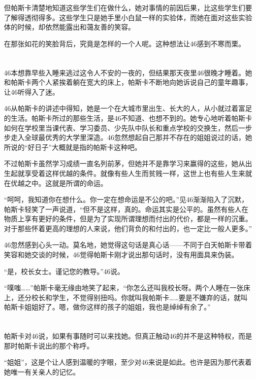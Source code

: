 但帕斯卡清楚地知道这些学生们在做什么，她对事情的前因后果，比这些学生们要了解得透彻得多。这些学生只是她手里小白鼠一样的实验体，而她在面对这些实验体的时候，却依然能露出和蔼友善的笑容。

在那张如花的笑脸背后，究竟是怎样的一个人呢。这种想法让46感到不寒而栗。

\section*{}

46本想靠早些入睡来逃过这令人不安的一夜的，但结果那天夜里46很晚才睡着。她和帕斯卡两个人紧挨着躺在宽大的床上，帕斯卡不断地向她诉说自己的童年趣事，让46听得入了迷。

46从帕斯卡的讲述中得知，她是一个在大城市里出生、长大的人，从小就过着富足的生活。帕斯卡所过的那些生活，是46不知道、也想不到的。她专心地听着帕斯卡如何在学校里当课代表、学习委员、少先队中队长和重点学校的交换生，然后一步步走入全球最优秀的大学里深造。46忽然想起自己那并不存在的姐姐说过的话，她所说的“好日子”大概就是指的帕斯卡这种吧。

不过帕斯卡虽然学习成绩一直名列前茅，但她并不是靠学习来赢得的这些，她从出生起就享受着这样优越的条件。就像有些人生而贫贱一样，这世上也有些人生来就在优越之中。这就是所谓的命运。

“呵呵，我知道你在想什么。你一定在想命运是不公的吧。”见46渐渐陷入了沉默，帕斯卡轻笑了一声说道，“但不是这样，真的。命运其实是公平的。虽然有些人在物质上享有更好的条件，但是为了实现所谓理想而付出的代价，都是一样的沉重。对于那些怀着更高的理想的人来说，他们背负的和付出的，也一定比一般人更多。”

46忽然感到心头一动。莫名地，她觉得这句话是真心话——不同于白天帕斯卡带着笑容和她交谈的时候，46觉得帕斯卡刚才说出那句话时，没有用面具来伪装。

“是，校长女士。谨记您的教导。”46说。

“噗嗤……”帕斯卡毫无缘由地笑了起来，“你怎么还叫我校长呀。两个人睡在一张床上，还分校长和学生，不觉得别扭吗。你就叫我帕斯卡……要是不嫌弃的话，就叫帕斯卡姐姐好了。嗯，做你这样的孩子的姐姐，我也是绰绰有余了。”

\section*{}

帕斯卡对46说，如果有事随时可以来找她。但真正触动46的并不是这种特权，而是那时帕斯卡说出的那个称呼。

“姐姐”，这是个让人感到温暖的字眼，至少对46来说是如此。也许是因为那代表着她唯一有关亲人的记忆。

